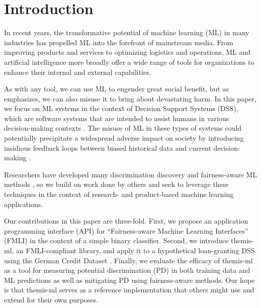 \documentclass{{interact/interact}}
\begin{document}




\section{Introduction} In recent years, the transformative potential of machine
learning (ML) in many industries has propelled ML into the forefront of
mainstream media. From improving products and services to optimizing logistics
and operations, ML and artificial intelligence more broadly offer a wide range
of tools for organizations to enhance their internal and external capabilities.

As with any tool, we can use ML to engender great social benefit, but as
\cite{o2017weapons} emphasizes, we can also misuse it to bring about devastating
harm. In this paper, we focus on ML systems in the context of Decision Support
Systems (DSS), which are software systems that are intended to assist humans in
various decision-making contexts \cite{yoshimura2006decision,
montgomery2000evaluation, barnett1987dxplain, mysiak2005towards}. The misuse of
ML in these types of systems could potentially precipitate a widespread adverse
impact on society by introducing insidious feedback loops between biased
historical data and current decision-making \cite{o2017weapons}.

Researchers have developed many discrimination discovery and fairness-aware ML
methods \cite{kusner2017counterfactual, kamiran2012data, kamishima2012fairness,
kamiran2012decision, zemel2013learning, zafar2017fairness, dwork2012fairness,
zliobaite2015survey}, so we build on work done by others and seek to leverage
these techniques in the context of research- and product-based machine learning
applications.

Our contributions in this paper are three-fold. First, we propose an application
programming interface (API) for ``Fairness-aware Machine Learning Interfaces''
(FMLI) in the context of a simple binary classifier. Second, we introduce
themis-ml, an FMLI-compliant library, and apply it to a hypothetical
loan-granting DSS using the German Credit Dataset \cite{bache2013uci}. Finally, we
evaluate the efficacy of themis-ml as a tool for measuring potential
discrimination (PD) in both training data and ML predictions as well as
mitigating PD using fairness-aware methods. Our hope is that themis-ml serves as
a reference implementation that others might use and extend for their own
purposes.
\end{document}
